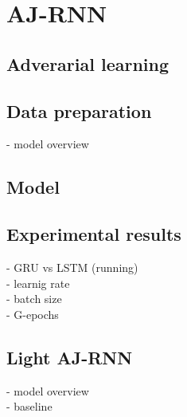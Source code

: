 \section{AJ-RNN}

\subsection{Adverarial learning}

\subsection{Data preparation}
- model overview

\subsection{Model}

\subsection{Experimental results}
- GRU vs LSTM (running)\\
- learnig rate\\
- batch size \\
- G-epochs

\subsection{Light AJ-RNN}
- model overview\\
- baseline